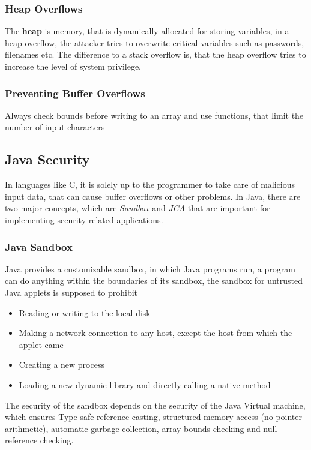\documentclass[a4paper, 10 pt, conference]{ieeeconf}
\begin{document}
\subsubsection{\textbf{Heap Overflows}}
The \textbf{heap} is memory, that is dynamically allocated for storing variables, in a heap overflow, the attacker tries to overwrite critical variables such as passwords, filenames etc. 
The difference to a stack overflow is, that the heap overflow tries to increase the level of system privilege. 
\vspace{0.5cm}
\subsubsection{\textbf{Preventing Buffer Overflows}}
Always check bounds before writing to an array and use functions, that limit the number of input characters

\subsection{\textbf{Java Security}}
In languages like C, it is solely up to the programmer to take care of malicious input data, that can cause buffer overflows or other problems. In Java, there are two major concepts, which are \emph{Sandbox} and \emph{JCA} that are important for implementing security related applications. 
\vspace{0.5cm}
\subsubsection{\textbf{Java Sandbox}}
Java provides a customizable sandbox, in which Java programs run, a program can do anything within the boundaries of its sandbox, the sandbox for untrusted Java applets is supposed to prohibit
\begin{itemize}
\item Reading or writing to the local disk
\item Making a network connection to any host, except the host from which the applet came
\item Creating a new process
\item Loading a new dynamic library and directly calling a native method
\end{itemize}

The security of the sandbox depends on the security of the Java Virtual machine, which ensures Type-safe reference casting, structured memory access (no pointer arithmetic), automatic garbage collection, array bounds checking and null reference checking. 
\end{document}
